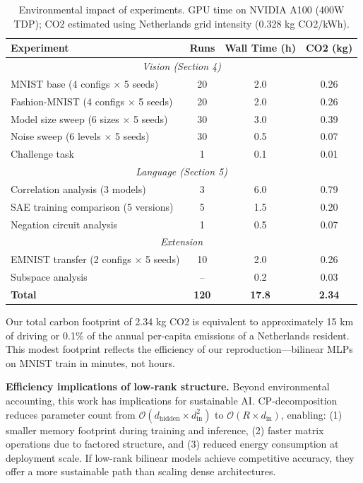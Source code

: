 \begin{table}[h]
    \caption{Environmental impact of experiments. GPU time on NVIDIA A100 (400W TDP); CO2 estimated using Netherlands grid intensity (0.328 kg CO2/kWh).}
    \label{tab:environmental}
    \centering
    \begin{tabular}{lccc}
        \toprule
        Experiment & Runs & Wall Time (h) & CO2 (kg) \\
        \midrule
        \multicolumn{4}{c}{\textit{Vision (Section 4)}} \\
        \midrule
        MNIST base (4 configs $\times$ 5 seeds) & 20 & 2.0 & 0.26 \\
        Fashion-MNIST (4 configs $\times$ 5 seeds) & 20 & 2.0 & 0.26 \\
        Model size sweep (6 sizes $\times$ 5 seeds) & 30 & 3.0 & 0.39 \\
        Noise sweep (6 levels $\times$ 5 seeds) & 30 & 0.5 & 0.07 \\
        Challenge task & 1 & 0.1 & 0.01 \\
        \midrule
        \multicolumn{4}{c}{\textit{Language (Section 5)}} \\
        \midrule
        Correlation analysis (3 models) & 3 & 6.0 & 0.79 \\
        SAE training comparison (5 versions) & 5 & 1.5 & 0.20 \\
        Negation circuit analysis & 1 & 0.5 & 0.07 \\
        \midrule
        \multicolumn{4}{c}{\textit{Extension}} \\
        \midrule
        EMNIST transfer (2 configs $\times$ 5 seeds) & 10 & 2.0 & 0.26 \\
        Subspace analysis & -- & 0.2 & 0.03 \\
        \midrule
        \textbf{Total} & \textbf{120} & \textbf{17.8} & \textbf{2.34} \\
        \bottomrule
    \end{tabular}
\end{table}

Our total carbon footprint of 2.34 kg CO2 is equivalent to approximately 15 km of driving or 0.1\% of the annual per-capita emissions of a Netherlands resident.
This modest footprint reflects the efficiency of our reproduction---bilinear MLPs on MNIST train in minutes, not hours.

\textbf{Efficiency implications of low-rank structure.}
Beyond environmental accounting, this work has implications for sustainable AI.
CP-decomposition reduces parameter count from $\mathcal{O}(d_{\text{hidden}} \times d_{\text{in}}^2)$ to $\mathcal{O}(R \times d_{\text{in}})$, enabling:
(1) smaller memory footprint during training and inference,
(2) faster matrix operations due to factored structure, and
(3) reduced energy consumption at deployment scale.
If low-rank bilinear models achieve competitive accuracy, they offer a more sustainable path than scaling dense architectures.

